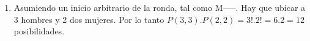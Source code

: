 \documentclass[a4paper]{article}
\begin{document}
\begin{enumerate}
\begin{enumerate} [label=(\alph*)]
		\item Asumiendo un inicio arbitrario de la ronda, tal como M-----. Hay que ubicar a 3 hombres y 2 dos mujeres. Por lo tanto $P(3,3).P(2,2)=3!.2!=6.2=12$ posibilidades.
\end{enumerate}\end{enumerate}
\end{document}
